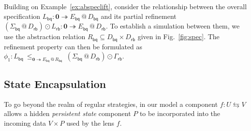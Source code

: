 \documentclass[acmsmall,screen,review,anonymous,nonacm]{acmart}
\newcommand{\kw}[1]{\ensuremath{ \mathsf{#1} }}
\newcommand{\emptysig}{\mathbf0}
\begin{document}
\begin{example} \label{ex:bqcorrect} %
Building on Example~\ref{ex:abspeclift},
consider the relationship between
the overall specification $
  L_\kw{bq} :
    \emptysig \twoheadrightarrow E_\kw{bq} \mathbin@ D_\kw{bq}
$
and its partial refinement
$
  (\Sigma_\kw{bq} \mathbin@ D_\kw{rb}) \odot L_\kw{rb} :
    \emptysig \twoheadrightarrow E_\kw{bq} \mathbin@ D_\kw{rb}
$.
To establish a simulation between them,
we use the abstraction relation
$R_\kw{bq} \subseteq D_\kw{bq} \times D_\kw{rb}$
given in Fig.~\ref{fig:spec}.
The refinement property can then be formulated as
$
  \phi_1 :
  L_\kw{bq}
  \:\le_{\emptysig \twoheadrightarrow E_\kw{bq} \mathbin@ R_\kw{bq}}\:
  (\Sigma_\kw{bq} \mathbin@ D_\kw{rb}) \odot
  \Gamma_\kw{rb}
$.
\end{example}

\subsection{State Encapsulation}
\label{sec:state:encap}

To go beyond the realm of regular strategies,
in our model a component $f : U \leftrightarrows V$
allows a hidden \emph{persistent state} component $P$
to be incorporated into the incoming data $V \times P$
used by the lens $f$.
\end{document}
